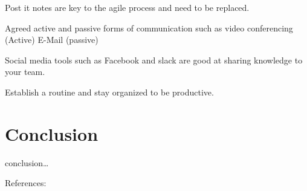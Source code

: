 \documentclass{scrartcl}
\begin{document}
Post it notes are key to the agile process and need to be replaced.

Agreed active and passive forms of communication such as video conferencing (Active) E-Mail (passive) \cite{joshi2013}

Social media tools such as Facebook and slack are good at sharing knowledge to your team.

 Establish a routine and stay organized to be productive.

\section{Conclusion}

conclusion\ldots

References:
\cite{bhalerao2010}
\cite{scharff2012}
\cite{abdullah2011}
\cite{joshi2013}
\cite{krasteva2008}
\cite{williams2012}
\cite{marjaie2011}
\cite{kumar2015}
\cite{cohn2003} %



\end{document}
